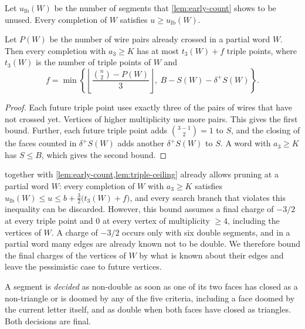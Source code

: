 Let $u_{\mathrm{lb}}(W)$ be the number of segments that \cref{lem:early-count} shows to be unused. Every completion of $W$ satisfies $u\ge u_{\mathrm{lb}}(W)$.

\begin{lemma}\label{lem:triple-ceiling}
Let $P(W)$ be the number of wire pairs already crossed in a partial word $W$.
Then every completion with $a_3\ge K$ has at most $t_3(W)+f$ triple points, where $t_3(W)$ is the number of triple points of $W$ and
\[
f=\min\left\{\left\lfloor\frac{\binom n2-P(W)}3\right\rfloor,\
B-S(W)-\delta^+S(W)\right\}.
\]
\end{lemma}

\begin{proof}
Each future triple point uses exactly three of the pairs of wires that have not crossed yet.
Vertices of higher multiplicity use more pairs.
This gives the first bound.
Further, each future triple point adds $\binom{3-1}2=1$ to $S$, and the closing of the faces counted in $\delta^+S(W)$ adds another $\delta^+S(W)$ to $S$.
A word with $a_3\ge K$ has $S\le B$, which gives the second bound.
\end{proof}

 together with \cref{lem:early-count,lem:triple-ceiling} already allows pruning at a partial word $W$: every completion of $W$ with $a_3\ge K$ satisfies $u_{\mathrm{lb}}(W)\le u\le b+\tfrac32\bigl(t_3(W)+f\bigr)$, and every search branch that violates this inequality can be discarded.
However, this bound assumes a final charge of $-3/2$ at every triple point and $0$ at every vertex of multiplicity $\ge4$, including the vertices of $W$.
A charge of $-3/2$ occurs only with six double segments, and in a partial word many edges are already known not to be double. We therefore bound the final charges of the vertices of $W$ by what is known about their edges and leave the pessimistic case to future vertices.

A segment is \emph{decided} as non-double as soon as one of its two faces has closed as a non-triangle or is doomed by any of the five criteria, including a face doomed by the current letter itself, and as double when both faces have closed as triangles.
Both decisions are final.

